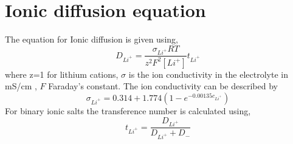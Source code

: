 \documentclass[12pt]{book}
\begin{document}
\section{Ionic diffusion equation}
The equation for Ionic diffusion is given using,
\begin{equation}
D_{Li^+}=\frac{\sigma_{Li^+}RT}{z^2F^2[Li^+]}t_{Li^+}
\end{equation}
where z=1 for lithium cations, $\sigma$ is the ion conductivity in the electrolyte in mS/cm \cite{Read2003}, $F$ Faraday's constant. The ion conductivity can be described by\cite{Jung2015}
\begin{equation}
\sigma_{Li^+} = 0.314 + 1.774\left(1-e^{-0.00135c_{Li^+}}\right)
\end{equation}
For binary ionic salts the transference number is calculated using,
\begin{equation*}
t_{Li^+}=\frac{D_{Li^+}}{D_{Li^+}+D_{-}}
\end{equation*} 
\end{document}
